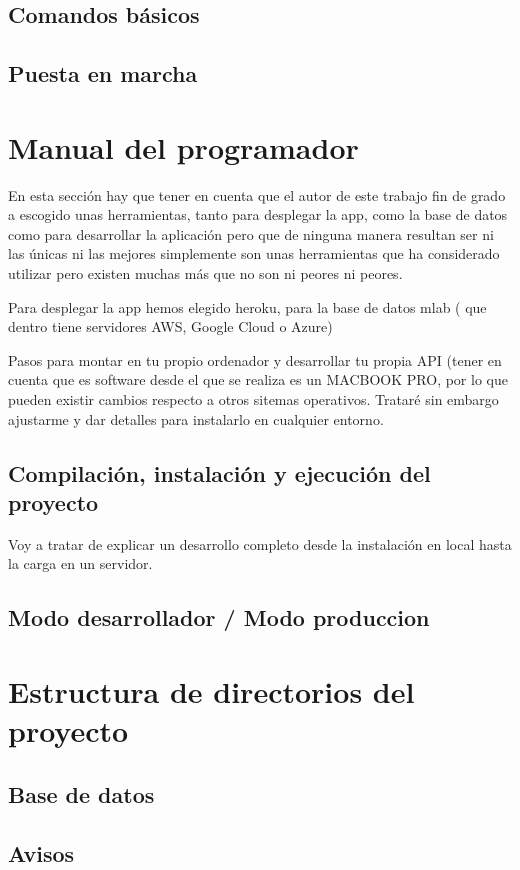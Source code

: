 \subsection{Comandos básicos}\label{cbasicos}

\subsection{Puesta en marcha}\label{typesript}


\section{Manual del programador}
En esta sección hay que tener en cuenta que el autor de este trabajo fin de grado a escogido unas herramientas, tanto para desplegar la app, como la base de datos como para desarrollar la aplicación pero que de ninguna manera resultan ser ni las únicas ni las mejores simplemente son unas herramientas que ha considerado utilizar pero existen muchas más que no son ni peores ni peores. 

Para desplegar la app hemos elegido heroku, para la base de datos mlab ( que dentro tiene servidores AWS, Google Cloud o Azure)

Pasos para montar en tu propio ordenador y desarrollar tu propia API (tener en cuenta que es software desde el que se realiza es un MACBOOK PRO, por lo que pueden existir cambios respecto a otros sitemas operativos. Trataré sin embargo ajustarme y dar detalles para instalarlo en cualquier entorno.

\subsection{Compilación, instalación y ejecución del proyecto}
Voy a tratar de explicar un desarrollo completo desde la instalación en local hasta la carga en un servidor. 


\subsection{Modo desarrollador / Modo produccion}


\section{Estructura de directorios del proyecto}\label{directorios}

\subsection{Base de datos}




\subsection{Avisos}


